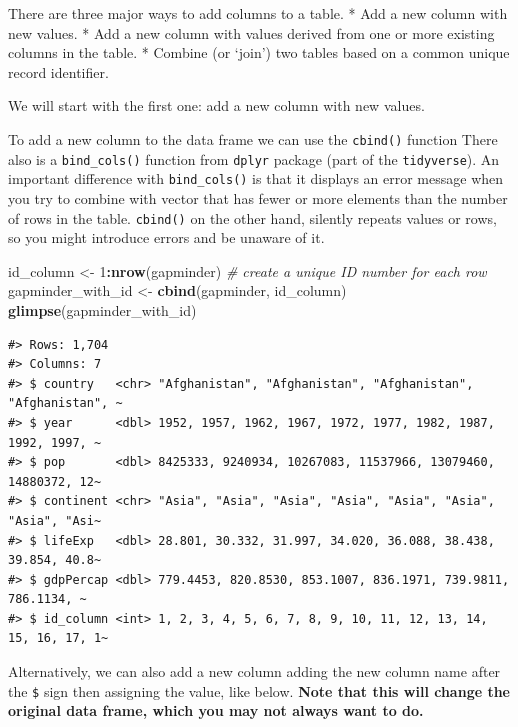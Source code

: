 \documentclass[
]{book}
\newenvironment{Shaded}{\begin{snugshade}}{\end{snugshade}}
\newcommand{\CommentTok}[1]{\textcolor[rgb]{0.56,0.35,0.01}{\textit{#1}}}
\newcommand{\DecValTok}[1]{\textcolor[rgb]{0.00,0.00,0.81}{#1}}
\newcommand{\FunctionTok}[1]{\textcolor[rgb]{0.13,0.29,0.53}{\textbf{#1}}}
\newcommand{\NormalTok}[1]{#1}
\newcommand{\OtherTok}[1]{\textcolor[rgb]{0.56,0.35,0.01}{#1}}
\newcommand{\SpecialCharTok}[1]{\textcolor[rgb]{0.81,0.36,0.00}{\textbf{#1}}}
\begin{document}
There are three major ways to add columns to a table.
* Add a new column with new values.
* Add a new column with values derived from one or more existing columns in the table.
* Combine (or `join') two tables based on a common unique record identifier.

We will start with the first one: add a new column with new values.

To add a new column to the data frame we can use the \texttt{cbind()} function There also is a \texttt{bind\_cols()} function from \texttt{dplyr} package (part of the \texttt{tidyverse}). An important difference with \texttt{bind\_cols()} is that it displays an error message when you try to combine with vector that has fewer or more elements than the number of rows in the table. \texttt{cbind()} on the other hand, silently repeats values or rows, so you might introduce errors and be unaware of it.

\begin{Shaded}
\begin{Highlighting}[]
\NormalTok{id\_column }\OtherTok{\textless{}{-}} \DecValTok{1}\SpecialCharTok{:}\FunctionTok{nrow}\NormalTok{(gapminder) }\CommentTok{\# create a unique ID number for each row}
\NormalTok{gapminder\_with\_id }\OtherTok{\textless{}{-}} \FunctionTok{cbind}\NormalTok{(gapminder, id\_column) }
\FunctionTok{glimpse}\NormalTok{(gapminder\_with\_id)}
\end{Highlighting}
\end{Shaded}

\begin{verbatim}
#> Rows: 1,704
#> Columns: 7
#> $ country   <chr> "Afghanistan", "Afghanistan", "Afghanistan", "Afghanistan", ~
#> $ year      <dbl> 1952, 1957, 1962, 1967, 1972, 1977, 1982, 1987, 1992, 1997, ~
#> $ pop       <dbl> 8425333, 9240934, 10267083, 11537966, 13079460, 14880372, 12~
#> $ continent <chr> "Asia", "Asia", "Asia", "Asia", "Asia", "Asia", "Asia", "Asi~
#> $ lifeExp   <dbl> 28.801, 30.332, 31.997, 34.020, 36.088, 38.438, 39.854, 40.8~
#> $ gdpPercap <dbl> 779.4453, 820.8530, 853.1007, 836.1971, 739.9811, 786.1134, ~
#> $ id_column <int> 1, 2, 3, 4, 5, 6, 7, 8, 9, 10, 11, 12, 13, 14, 15, 16, 17, 1~
\end{verbatim}

Alternatively, we can also add a new column adding the new column name after the \texttt{\$} sign then assigning the value, like below. \textbf{Note that this will change the original data frame, which you may not always want to do.}
\end{document}
